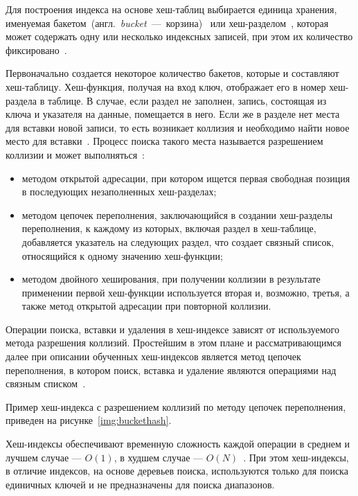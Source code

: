 Для построения индекса на основе хеш-таблиц выбирается единица хранения,
именуемая
\mbox{бакетом}~(англ.~\textit{bucket}~---~\mbox{корзина})~\cite{marvel} или
\mbox{хеш-разделом}~\cite{amur}, которая может содержать одну или несколько
индексных записей, при этом их количество фиксировано~\cite{ship}.

Первоначально создается некоторое количество бакетов, которые и составляют
хеш-таблицу. Хеш-функция, получая на вход ключ, отображает его в номер
хеш-раздела в таблице. В случае, если раздел не заполнен, запись, состоящая из
ключа и указателя на данные, помещается в него. Если же в разделе нет места для
вставки новой записи, то есть возникает коллизия и необходимо найти новое место
для вставки~\cite{marvel}. Процесс поиска такого места называется разрешением
коллизии и может выполняться~\cite{baw}:

\begin{itemize}
    \item методом открытой адресации, при котором ищется первая свободная
        позиция в последующих незаполненных хеш-разделах;
    \item методом цепочек переполнения, заключающийся в создании хеш-разделы
        переполнения, к каждому из которых, включая раздел в хеш-таблице,
        добавляется указатель на следующих раздел, что создает связный список,
        относящийся к одному значению хеш-функции;
    \item методом двойного хеширования, при получении коллизии в результате
        применении первой хеш-функции используется вторая и, возможно, третья, а
        также метод открытой адресации при повторной коллизии.
\end{itemize}

Операции поиска, вставки и удаления в хеш-индексе зависят от используемого
метода разрешения коллизий. Простейшим в этом плане и рассматривающимся далее
при описании обученных хеш-индексов является метод цепочек переполнения, в
котором поиск, вставка и удаление являются операциями над связным
списком~\cite{baw}.

Пример хеш-индекса с разрешением коллизий по методу цепочек переполнения,
приведен на рисунке~\ref{img:buckethash}.


Хеш-индексы обеспечивают временную сложность каждой операции в
среднем и лучшем случае --- $O(1)$, в худшем случае --- $O(N)$~\cite{squares}.
При этом хеш-индексы, в отличие индексов, на основе деревьев поиска,
используются только для поиска единичных ключей и не предназначены для поиска
диапазонов.

